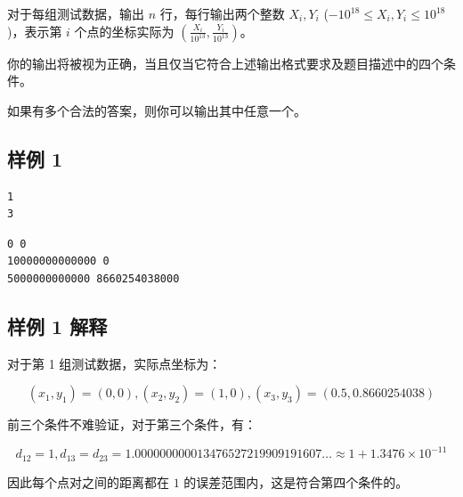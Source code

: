 对于每组测试数据，输出 $n$ 行，每行输出两个整数 $X_i, Y_i$ ($-10^{18} \le X_i, Y_i \le 10^{18}$)，表示第 $i$ 个点的坐标实际为 $\left( \frac{X_i}{10^{13}}, \frac{Y_i}{10^{13}}\right)$。

你的输出将被视为正确，当且仅当它符合上述输出格式要求及题目描述中的四个条件。

如果有多个合法的答案，则你可以输出其中任意一个。

\subsection{样例 1}

\begin{minipage}{\linewidth}
	\begin{minipage}[t]{0.49\linewidth}
		\begin{lstlisting}[title=\texttt{standard input}]
1
3
\end{lstlisting}
	\end{minipage}
	\begin{minipage}[t]{0.49\linewidth}
		\begin{lstlisting}[title=\texttt{standard output}]
0 0
10000000000000 0
5000000000000 8660254038000
\end{lstlisting}
	\end{minipage}
\end{minipage}


\subsection{样例 1 解释}

对于第 1 组测试数据，实际点坐标为：

\[
	(x_1, y_1) = (0, 0), (x_2, y_2) = (1, 0), (x_3, y_3) = (0.5, 0.8660254038)
\]

前三个条件不难验证，对于第三个条件，有：

\[d_{12} = 1, d_{13} = d_{23} = 1.000000000013476527219909191607\ldots \approx 1 + 1.3476 \times 10^{-11} \]

因此每个点对之间的距离都在 $1$ 的误差范围内，这是符合第四个条件的。


